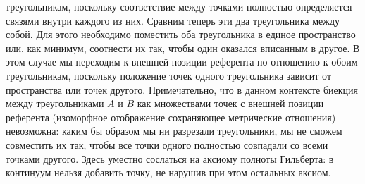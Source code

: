 \documentclass[12pt]{article}
\begin{document}
треугольникам, поскольку соответствие между точками полностью определяется связями внутри каждого из них. Сравним теперь эти два треугольника между собой. Для этого необходимо поместить оба треугольника в единое пространство или, как минимум, соотнести их так, чтобы один оказался вписанным в другое. В этом случае мы переходим к внешней позиции референта по отношению к обоим треугольникам, поскольку положение точек одного треугольника зависит от пространства или точек другого. Примечательно, что в данном контексте биекция между треугольниками $A$ и $B$ как множествами точек с внешней позиции референта (изоморфное отображение сохраняющее метрические отношения) невозможна: каким бы образом мы ни разрезали треугольники, мы не сможем совместить их так, чтобы все точки одного полностью совпадали со всеми точками другого. Здесь уместно сослаться на аксиому полноты Гильберта: в континуум нельзя добавить точку, не нарушив при этом остальных аксиом.
\end{document}
